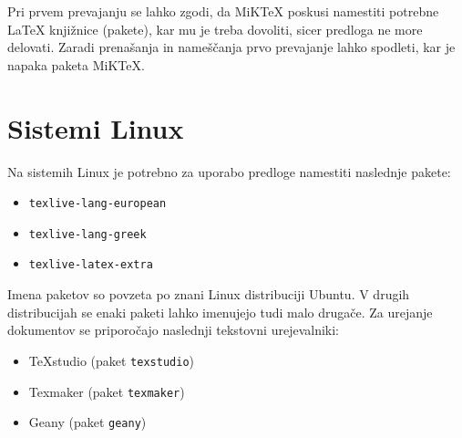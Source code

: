 \documentclass[a4paper,twoside,openright,12pt,slovene]{book}
\begin{document}
Pri prvem prevajanju se lahko zgodi, da MiKTeX poskusi namestiti potrebne LaTeX knjižnice (pakete), kar mu je treba dovoliti, sicer predloga ne more delovati. Zaradi prenašanja in nameščanja prvo prevajanje lahko spodleti, kar je napaka paketa MiKTeX.

\section{Sistemi Linux}

Na sistemih Linux je potrebno za uporabo predloge namestiti naslednje pakete:

\begin{itemize}[noitemsep]
    \item \texttt{texlive-lang-european}
    \item \texttt{texlive-lang-greek}
    \item \texttt{texlive-latex-extra}
\end{itemize}

Imena paketov so povzeta po znani Linux distribuciji Ubuntu. V drugih distribucijah se enaki paketi lahko imenujejo tudi malo drugače. Za urejanje dokumentov se priporočajo naslednji tekstovni urejevalniki:

\begin{itemize}[noitemsep]
    \item TeXstudio (paket \texttt{texstudio})
    \item Texmaker (paket \texttt{texmaker})
    \item Geany (paket \texttt{geany})
\end{itemize}
\end{document}
